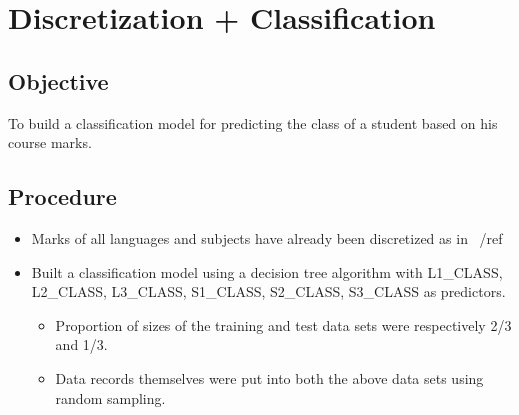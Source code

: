 \chapter{Discretization + Classification}
\label{chap:experiment1}

\section*{Objective}
To build a classification model for predicting the class of a student based on his course marks.

\section*{Procedure}
\begin{itemize}
\item Marks of all languages and subjects have already been discretized as in ~/ref{}
\item Built a classification model using a decision tree algorithm with L1{\_}CLASS, L2{\_}CLASS, L3{\_}CLASS, S1{\_}CLASS, S2{\_}CLASS, S3{\_}CLASS as predictors.
\begin{itemize}
\item Proportion of sizes of the training and test data sets were respectively 2/3 and 1/3.
\item Data records themselves were put into both the above data sets using random sampling.
\end{itemize}
\end{itemize}

